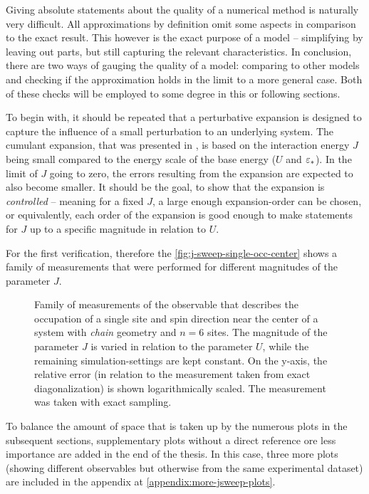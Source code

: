Giving absolute statements about the quality of a numerical method is naturally very difficult.
All approximations by definition omit some aspects in comparison to the exact result.
This however is the exact purpose of a model -- simplifying by leaving out parts, but still capturing the relevant characteristics.
In conclusion, there are two ways of gauging the quality of a model: comparing to other models and checking if the approximation holds in the limit to a more general case.
Both of these checks will be employed to some degree in this or following sections.

To begin with, it should be repeated that a perturbative expansion is designed to capture the influence of a \glqq small\grqq{} perturbation to an underlying system.
The cumulant expansion, that was presented in , is based on the interaction energy $J$ being small compared to the energy scale of the base energy ($U$ and $\epsl[\ast]$).
In the limit of $J$ going to zero, the errors resulting from the expansion are expected to also become smaller.
It should be the goal, to show that the expansion is \emph{controlled} -- meaning for a fixed $J$, a large enough expansion-order can be chosen, or equivalently, each order of the expansion is good enough to make statements for $J$ up to a specific magnitude in relation to $U$. 

For the first verification, therefore the \autoref{fig:j-sweep-single-occ-center} shows a family of measurements that were performed for different magnitudes of the parameter $J$.

\begin{figure}[htbp]
    \centering
    \vspace{-0.7cm}
    \caption{
            Family of measurements of the observable that describes the occupation of a single site and spin direction near the center of a system with \emph{chain} geometry and $n=6$ sites.
            The magnitude of the parameter $J$ is varied in relation to the parameter $U$, while the remaining simulation-settings are kept constant.
            On the y-axis, the relative error (in relation to the measurement taken from exact diagonalization) is shown logarithmically scaled.
            The measurement was taken with exact sampling.
        }
    \label{fig:j-sweep-single-occ-center}
\end{figure}

To balance the amount of space that is taken up by the numerous plots in the subsequent sections, supplementary plots without a direct reference ore less importance are added in the end of the thesis.
In this case, three more plots (showing different observables but otherwise from the same experimental dataset) are included in the appendix at \ref{appendix:more-jsweep-plots}.


